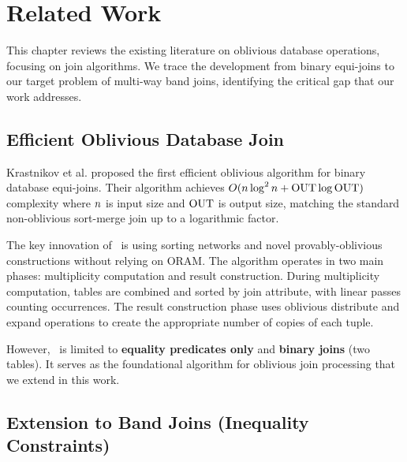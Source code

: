 \chapter{Related Work}

This chapter reviews the existing literature on oblivious database operations, focusing on join algorithms. We trace the development from binary equi-joins to our target problem of multi-way band joins, identifying the critical gap that our work addresses.

\section{Efficient Oblivious Database Join}

Krastnikov et al. proposed the first efficient oblivious algorithm for binary database equi-joins. Their algorithm achieves $O(n \log^2 n + \text{OUT} \log \text{OUT})$ complexity where $n$ is input size and $\text{OUT}$ is output size, matching the standard non-oblivious sort-merge join up to a logarithmic factor.

The key innovation of \odbj\ is using sorting networks and novel provably-oblivious constructions without relying on ORAM. The algorithm operates in two main phases: multiplicity computation and result construction. During multiplicity computation, tables are combined and sorted by join attribute, with linear passes counting occurrences. The result construction phase uses oblivious distribute and expand operations to create the appropriate number of copies of each tuple.

However, \odbj\ is limited to \textbf{equality predicates only} and \textbf{binary joins} (two tables). It serves as the foundational algorithm for oblivious join processing that we extend in this work.

\section{Extension to Band Joins (Inequality Constraints)}

